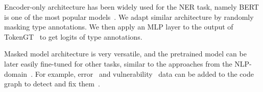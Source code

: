 Encoder-only architecture has been widely used for the NER task, namely BERT is one of the most popular models~\cite{liu2021nerbert,Darji_2023}.
We adapt similar architecture by randomly masking type annotations.
We then apply an MLP layer to the output of TokenGT~\cite{kim_pure_2022} to get logits of type annotations.

Masked model architecture is very versatile, and the pretrained model can be later easily fine-tuned for other tasks,
similar to the approaches from the NLP-domain~\cite{liu2021nerbert}.
For example, error~\cite{bieber2022static} and vulnerability~\cite{sun2023exploring} data can be added to the code graph to detect and fix them~\cite{nguyen_regvd_2021,li_vuldeepecker_2018,cao_bgnn4vd_2021,li_sysevr_2021,russell_automated_2018}.
